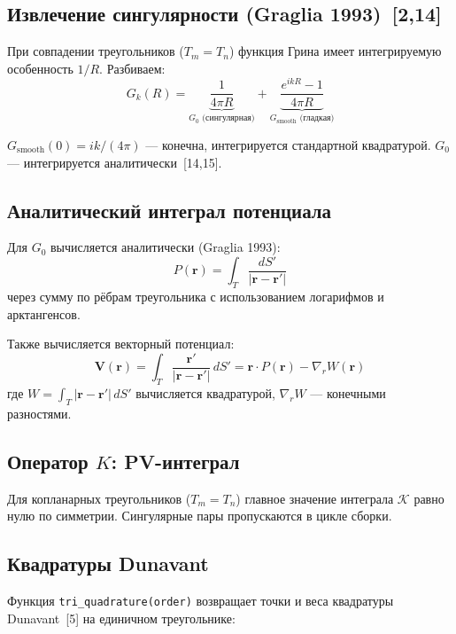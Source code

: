 \documentclass[12pt,a4paper]{article}
\begin{document}
\subsection{Извлечение сингулярности (Graglia 1993)~[2,14]}

При совпадении треугольников ($T_m = T_n$) функция Грина имеет интегрируемую особенность $1/R$. Разбиваем:
\begin{equation}
  G_k(R) = \underbrace{\frac{1}{4\pi R}}_{G_0 \text{ (сингулярная)}}
  + \underbrace{\frac{e^{ikR} - 1}{4\pi R}}_{G_{\mathrm{smooth}} \text{ (гладкая)}}
\end{equation}

$G_{\mathrm{smooth}}(0) = ik/(4\pi)$ --- конечна, интегрируется стандартной квадратурой. $G_0$ --- интегрируется аналитически~[14,15].

\subsection{Аналитический интеграл потенциала}

Для $G_0$ вычисляется аналитически (Graglia 1993):
\begin{equation}
  P(\mathbf{r}) = \int_T \frac{dS'}{|\mathbf{r} - \mathbf{r}'|}
\end{equation}
через сумму по рёбрам треугольника с использованием логарифмов и арктангенсов.

Также вычисляется векторный потенциал:
\begin{equation}
  \mathbf{V}(\mathbf{r}) = \int_T \frac{\mathbf{r}'}{|\mathbf{r} - \mathbf{r}'|} \, dS'
  = \mathbf{r} \cdot P(\mathbf{r}) - \nabla_r W(\mathbf{r})
\end{equation}
где $W = \int_T |\mathbf{r} - \mathbf{r}'| \, dS'$ вычисляется квадратурой, $\nabla_r W$ --- конечными разностями.

\subsection{Оператор $K$: PV-интеграл}

Для копланарных треугольников ($T_m = T_n$) главное значение интеграла $\mathcal{K}$ равно нулю по симметрии. Сингулярные пары пропускаются в цикле сборки.

\subsection{Квадратуры Dunavant}
\label{sec:quadrature}

Функция \texttt{tri\_quadrature(order)} возвращает точки и веса квадратуры Dunavant~[5] на единичном треугольнике:
\end{document}
